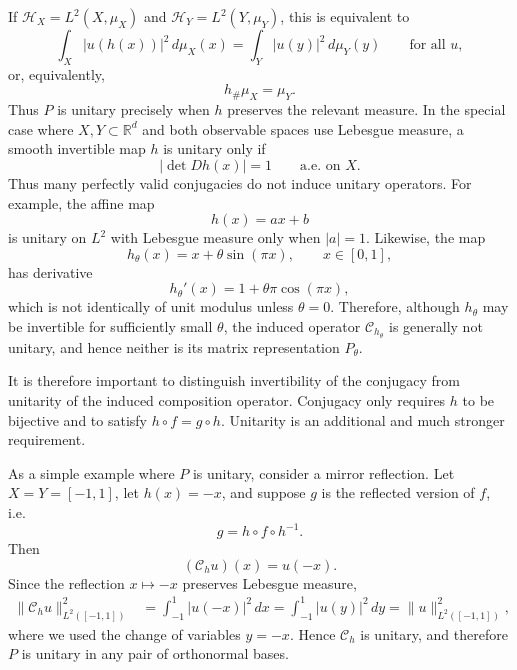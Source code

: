 \documentclass{article}
\theoremstyle{definition}
\begin{document}
If \(\mathcal H_X=L^2(X,\mu_X)\) and \(\mathcal H_Y=L^2(Y,\mu_Y)\), this is equivalent to
\begin{equation}
    \int_X |u(h(x))|^2\,d\mu_X(x)
    =
    \int_Y |u(y)|^2\,d\mu_Y(y)
    \qquad \text{for all } u,
\end{equation}
or, equivalently,
\begin{equation}
    h_\#\mu_X = \mu_Y.
\end{equation}
Thus \(P\) is unitary precisely when \(h\) preserves the relevant measure. In the special case where \(X,Y\subset\mathbb{R}^d\) and both observable spaces use Lebesgue measure, a smooth invertible map \(h\) is unitary only if
\begin{equation}
    |\det Dh(x)| = 1
    \qquad \text{a.e. on } X.
\end{equation}
Thus many perfectly valid conjugacies do not induce unitary operators. For example, the affine map
\begin{equation}
    h(x)=ax+b
\end{equation}
is unitary on \(L^2\) with Lebesgue measure only when \(|a|=1\). Likewise, the map
\begin{equation}
    h_\theta(x)=x+\theta \sin(\pi x),
    \qquad x\in[0,1],
\end{equation}
has derivative
\begin{equation}
    h_\theta'(x)=1+\theta\pi\cos(\pi x),
\end{equation}
which is not identically of unit modulus unless \(\theta=0\). Therefore, although \(h_\theta\) may be invertible for sufficiently small \(\theta\), the induced operator \(\mathcal{C}_{h_\theta}\) is generally not unitary, and hence neither is its matrix representation \(P_\theta\).

It is therefore important to distinguish invertibility of the conjugacy from unitarity of the induced composition operator. Conjugacy only requires \(h\) to be bijective and to satisfy \(h\circ f = g\circ h\). Unitarity is an additional and much stronger requirement.

As a simple example where \(P\) is unitary, consider a mirror reflection. Let \(X=Y=[-1,1]\), let \(h(x)=-x\), and suppose \(g\) is the reflected version of \(f\), i.e.
\begin{equation}
    g = h\circ f \circ h^{-1}.
\end{equation}
Then
\begin{equation}
    (\mathcal{C}_h u)(x)=u(-x).
\end{equation}
Since the reflection \(x\mapsto -x\) preserves Lebesgue measure,
\begin{align}
    \|\mathcal{C}_h u\|_{L^2([-1,1])}^2
    &= \int_{-1}^1 |u(-x)|^2\,dx
     = \int_{-1}^1 |u(y)|^2\,dy
     = \|u\|_{L^2([-1,1])}^2,
\end{align}
where we used the change of variables \(y=-x\). Hence \(\mathcal{C}_h\) is unitary, and therefore \(P\) is unitary in any pair of orthonormal bases.
\end{document}
